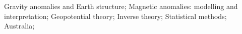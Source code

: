 Gravity anomalies and Earth structure;
Magnetic anomalies: modelling and interpretation;
Geopotential theory;
Inverse theory;
Statistical methods;
Australia;
